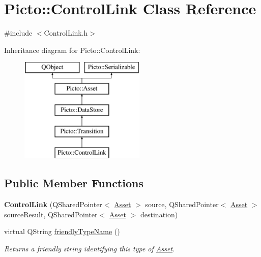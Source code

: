\hypertarget{class_picto_1_1_control_link}{\section{Picto\-:\-:Control\-Link Class Reference}
\label{class_picto_1_1_control_link}
}


{\ttfamily \#include $<$Control\-Link.\-h$>$}

Inheritance diagram for Picto\-:\-:Control\-Link\-:\begin{figure}[H]
\begin{center}
\leavevmode
\includegraphics[height=5.000000cm]{class_picto_1_1_control_link}
\end{center}
\end{figure}
\subsection*{Public Member Functions}
\begin{DoxyCompactItemize}
\item 
\hypertarget{class_picto_1_1_control_link_abc1bc49159a00a9f675b83a42fee932a}{{\bfseries Control\-Link} (Q\-Shared\-Pointer$<$ \hyperlink{class_picto_1_1_asset}{Asset} $>$ source, Q\-Shared\-Pointer$<$ \hyperlink{class_picto_1_1_asset}{Asset} $>$ source\-Result, Q\-Shared\-Pointer$<$ \hyperlink{class_picto_1_1_asset}{Asset} $>$ destination)}\label{class_picto_1_1_control_link_abc1bc49159a00a9f675b83a42fee932a}

\item 
virtual Q\-String \hyperlink{class_picto_1_1_control_link_aabf0bf910f45302c121c2457ae50e980}{friendly\-Type\-Name} ()
\begin{DoxyCompactList}\small\item\em Returns a friendly string identifying this type of \hyperlink{class_picto_1_1_asset}{Asset}. \end{DoxyCompactList}\end{DoxyCompactItemize}
